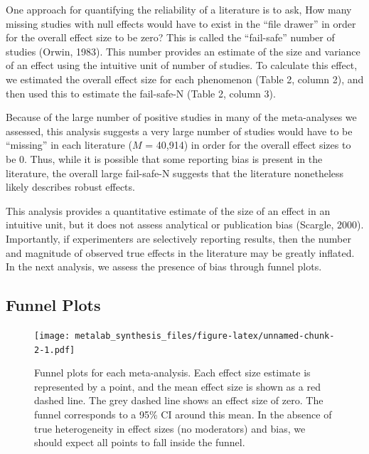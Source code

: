 \documentclass[english,floatsintext,man]{apa6}
\theoremstyle{definition}
\theoremstyle{definition}
\theoremstyle{remark}
\begin{document}
One approach for quantifying the reliability of a literature is to ask,
How many missing studies with null effects would have to exist in the
\enquote{file drawer} in order for the overall effect size to be zero?
This is called the \enquote{fail-safe} number of studies (Orwin, 1983).
This number provides an estimate of the size and variance of an effect
using the intuitive unit of number of studies. To calculate this effect,
we estimated the overall effect size for each phenomenon (Table 2,
column 2), and then used this to estimate the fail-safe-N (Table 2,
column 3).

Because of the large number of positive studies in many of the
meta-analyses we assessed, this analysis suggests a very large number of
studies would have to be \enquote{missing} in each literature (\(M\) =
40,914) in order for the overall effect sizes to be 0. Thus, while it is
possible that some reporting bias is present in the literature, the
overall large fail-safe-N suggests that the literature nonetheless
likely describes robust effects.

This analysis provides a quantitative estimate of the size of an effect
in an intuitive unit, but it does not assess analytical or publication
bias (Scargle, 2000). Importantly, if experimenters are selectively
reporting results, then the number and magnitude of observed true
effects in the literature may be greatly inflated. In the next analysis,
we assess the presence of bias through funnel plots.

\subsection{Funnel Plots}\label{funnel-plots}

\begin{figure}
\centering
\texttt{[image: metalab\_synthesis\_files/figure-latex/unnamed-chunk-2-1.pdf]}
\caption{\label{fig:unnamed-chunk-2}Funnel plots for each meta-analysis.
Each effect size estimate is represented by a point, and the mean effect
size is shown as a red dashed line. The grey dashed line shows an effect
size of zero. The funnel corresponds to a 95\% CI around this mean. In
the absence of true heterogeneity in effect sizes (no moderators) and
bias, we should expect all points to fall inside the funnel.}
\end{figure}
\end{document}
